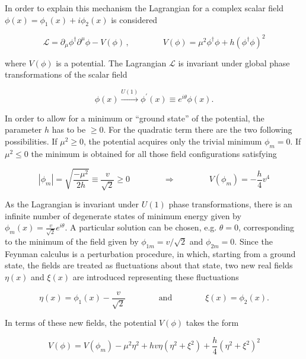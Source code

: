 In order to explain this mechanism the Lagrangian for a complex scalar field $\phi(x) = \phi_1(x) + i\phi_2(x)$ is considered

\begin{equation}\label{eqn:SM_e21}
\mathcal{L} = \partial_\mu\phi^\dag\partial^\mu\phi - V(\phi) \, , \qquad\qquad V(\phi) = \mu^2\phi^\dag\phi + h(\phi^\dag\phi)^2
\end{equation}

\noindent where $V(\phi)$ is a potential. 
The Lagrangian $\mathcal{L}$ is invariant under global phase transformations of the scalar field

\begin{equation}\label{eqn:SM_e22}
\phi(x) \xrightarrow{U(1)} \phi^\prime(x) \equiv e^{i\theta} \phi(x).
\end{equation}

In order to allow for a minimum or ``ground state'' of the potential, the parameter $h$ has to be $\geq 0$. For the quadratic term there are the two following possibilities.
If $\mu^2 \geq 0$, the potential acquires only the trivial minimum $\phi_m = 0$. If $\mu^2 \leq 0$ the minimum is obtained for all those field configurations satisfying

\begin{equation}\label{eqn:SM_e23}
|\phi_m| = \sqrt{\frac{-\mu^2}{2h}} \equiv \frac{v}{\sqrt{2}} \geq 0 \qquad\qquad \Rightarrow \qquad\qquad V(\phi_m) = -\frac{h}{4}v^4
\end{equation}

As the Lagrangian is invariant under $U(1)$ phase transformations, there is an infinite number of degenerate states of minimum energy given by 
$\phi_m(x) = \frac{v}{\sqrt{2}}e^{i\theta}$.
A particular solution can be chosen, e.g. $\theta = 0$, corresponding to the minimum of the field given by $\phi_{1m} = v/\sqrt{2}$ and $\phi_{2m} = 0$.
Since the Feynman calculus is a perturbation procedure, in which, starting from a ground state, the fields are treated as fluctuations about that state,
two new real fields $\eta(x)$ and $\xi(x)$ are introduced representing these fluctuations

\begin{equation}\label{eqn:SM_e24}
\eta(x) = \phi_1(x) - \frac{v}{\sqrt{2}} \qquad\qquad \mbox{and} \qquad\qquad \xi(x) = \phi_2(x).
\end{equation}

In terms of these new fields, the potential $V(\phi)$ takes the form

\begin{equation}\label{eqn:SM_e25}
V(\phi) = V(\phi_m) - \mu^2\eta^2 + hv\eta(\eta^2+\xi^2) + \frac{h}{4}(\eta^2+\xi^2)^2
\end{equation}

